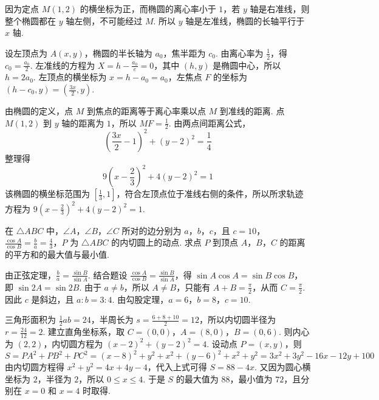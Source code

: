 \documentclass[UTF8,a4paper,oneside,11pt]{ctexbook}
\begin{document}
\begin{solution}
因为定点 \(M(1,2)\) 的横坐标为正，而椭圆的离心率小于 \(1\)，若 \(y\) 轴是右准线，则整个椭圆都在 \(y\) 轴左侧，不可能经过 \(M\). 所以 \(y\) 轴是左准线，椭圆的长轴平行于 \(x\) 轴.

设左顶点为 \(A(x,y)\)，椭圆的半长轴为 \(a_0\)，焦半距为 \(c_0\). 由离心率为 \(\frac12\)，得 \(c_0=\frac{a_0}{2}\). 左准线的方程为 \(X=h-\frac{a_0}{e}=0\)，其中 \((h,y)\) 是椭圆中心，所以 \(h=2a_0\). 左顶点的横坐标为 \(x=h-a_0=a_0\)，左焦点 \(F\) 的坐标为 \(\left(h-c_0,y\right)=\left(\frac{3x}{2},y\right)\).

由椭圆的定义，点 \(M\) 到焦点的距离等于离心率乘以点 \(M\) 到准线的距离. 点 \(M(1,2)\) 到 \(y\) 轴的距离为 \(1\)，所以 \(MF=\frac12\). 由两点间距离公式，
\[
\left(\frac{3x}{2}-1\right)^2+(y-2)^2=\frac14
\]
整理得
\[
9\left(x-\frac23\right)^2+4(y-2)^2=1
\]
该椭圆的横坐标范围为 \(\left[\frac13,1\right]\)，符合左顶点位于准线右侧的条件，所以所求轨迹方程为 \(9\left(x-\frac23\right)^2+4(y-2)^2=1\).
\end{solution}

\begin{problem}

在 \(\triangle ABC\) 中，\(\angle A\)，\(\angle B\)，\(\angle C\) 所对的边分别为 \(a\)，\(b\)，\(c\)，且 \(c = 10\)，\(\frac{\cos A}{\cos B} = \frac{b}{a} = \frac{4}{3}\)，\(P\) 为 \(\triangle ABC\) 的内切圆上的动点. 求点 \(P\) 到顶点 \(A\)，\(B\)，\(C\) 的距离的平方和的最大值与最小值.
\end{problem}

\begin{solution}
由正弦定理，\(\frac{b}{a}=\frac{\sin B}{\sin A}\). 结合题设 \(\frac{\cos A}{\cos B}=\frac{\sin B}{\sin A}\)，得 \(\sin A\cos A=\sin B\cos B\)，即 \(\sin2A=\sin2B\). 由于 \(a\neq b\)，所以 \(A\neq B\)，只能有 \(A+B=\frac\pi2\)，从而 \(C=\frac\pi2\). 因此 \(c\) 是斜边，且 \(a:b=3:4\). 由勾股定理，\(a=6\)，\(b=8\)，\(c=10\).

三角形面积为 \(\frac12ab=24\)，半周长为 \(s=\frac{6+8+10}{2}=12\)，所以内切圆半径为 \(r=\frac{24}{12}=2\). 建立直角坐标系，取 \(C=(0,0)\)，\(A=(8,0)\)，\(B=(0,6)\). 则内心为 \((2,2)\)，内切圆方程为 \((x-2)^2+(y-2)^2=4\). 设动点 \(P=(x,y)\)，则
\[
S=PA^2+PB^2+PC^2=(x-8)^2+y^2+x^2+(y-6)^2+x^2+y^2=3x^2+3y^2-16x-12y+100
\]
由内切圆方程得 \(x^2+y^2=4x+4y-4\)，代入上式可得 \(S=88-4x\). 又因为圆心横坐标为 \(2\)，半径为 \(2\)，所以 \(0\leqslant x\leqslant4\). 于是 \(S\) 的最大值为 \(88\)，最小值为 \(72\)，且分别在 \(x=0\) 和 \(x=4\) 时取得.
\end{solution}
\end{document}
